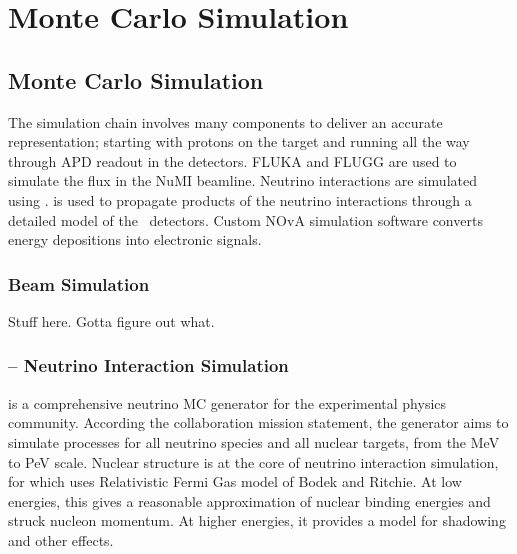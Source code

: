 \chapter{Monte Carlo Simulation}
\label{sim_chapter}


\section{Monte Carlo Simulation}
\label{sim}

The \nova simulation chain involves many components to deliver an accurate representation; starting with protons on the \numi target and running all the way through APD readout in the \nova detectors.  FLUKA and FLUGG are used to simulate the flux in the NuMI beamline.  \cite{fluka}  Neutrino interactions are simulated using \genie.\cite{genie}  \geant is used to propagate products of the neutrino interactions through a detailed model of the \nova~detectors.\cite{geant}  Custom NOvA simulation software converts energy depositions into electronic signals.


\subsection{Beam Simulation}


Stuff here.  Gotta figure out what.

\subsection{\genie -- Neutrino Interaction Simulation}



\genie is a comprehensive neutrino MC generator for the experimental physics community.  According the \genie collaboration mission statement, the generator aims to simulate processes  for all neutrino species and all nuclear targets, from the MeV to PeV scale.  Nuclear structure is at the core of neutrino interaction simulation, for which \genie uses  Relativistic Fermi Gas model of Bodek and Ritchie.  \cite{bodekritchie}  At low energies, this gives a reasonable approximation of nuclear binding energies and struck nucleon momentum.  At higher energies, it provides a model for shadowing and other effects.

